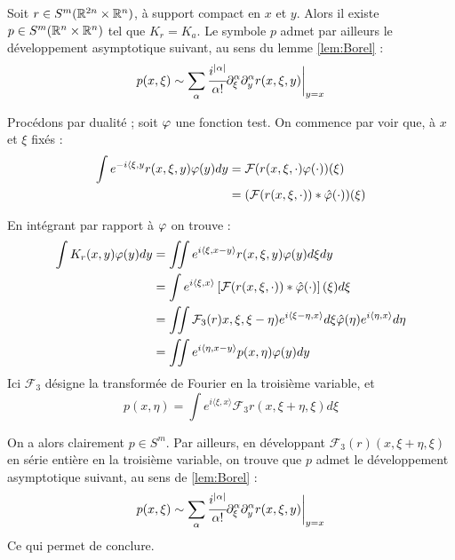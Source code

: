 \begin{lem}
	Soit $r \in S^m(\mathbb{R}^{2n}\times \mathbb{R}^n)$, à support compact en $x$ et $y$. Alors il existe $p \in S^m(\mathbb{R}^n \times \mathbb{R}^n)$ tel que $K_r = K_a$. Le symbole $p$ admet par ailleurs le développement asymptotique suivant, au sens du lemme \ref{lem:Borel} :
	\begin{equation*}
	p(x,\xi) \sim \sum_{\alpha}\cfrac{i^{|\alpha|}}{\alpha!}\partial^{\alpha}_{\xi}\partial^{\alpha}_yr(x,\xi,y)\biggl|_{y=x}
	\end{equation*}
\end{lem}
\begin{preuve}
	Procédons par dualité ; soit $\varphi$ une fonction test. On commence par voir que, à $x$ et $\xi$ fixés :
	\begin{align*}
		\int e^{-i\langle \xi, y}r(x,\xi,y)\varphi(y)dy &= \mathcal{F}(r(x,\xi,\cdot) \varphi(\cdot))(\xi)\\
			&= (\mathcal{F}(r(x,\xi,\cdot)) * \hat{\varphi}(\cdot))(\xi)
	\end{align*}
	
	En intégrant par rapport à $\varphi$ on trouve :
	\begin{align*}
		\int K_r(x,y)\varphi(y)dy &= \iint e^{i\langle \xi,x-y\rangle}r(x,\xi,y)\varphi(y)d\xi dy\\
		&=\int e^{i\langle \xi,x \rangle} \left[\mathcal{F}(r(x,\xi,\cdot))*\hat{\varphi}(\cdot)\right](\xi)d\xi\\
		&= \iint \mathcal{F}_3(r)x,\xi,\xi-\eta)e^{i\langle \xi-\eta,x\rangle}d\xi \hat{\varphi}(\eta)e^{i\langle \eta,x\rangle} d\eta\\
		&=\iint e^{i\langle \eta,x-y \rangle}  p(x,\eta) \varphi(y)dy
	\end{align*}
	Ici $\mathcal{F}_3$ désigne la transformée de Fourier en la troisième variable, et 
	\begin{equation*}
		p(x,\eta) = \int e^{i\langle \xi,x\rangle}\mathcal{F}_3{r}(x,\xi+\eta, \xi)d\xi
	\end{equation*}
	
	On a alors clairement $p \in S^m$. Par ailleurs, en développant $\mathcal{F}_3(r)(x,\xi+\eta, \xi)$ en série entière en la troisième variable, on trouve que $p$ admet le développement asymptotique suivant, au sens de \ref{lem:Borel} :
	\begin{equation*}
		p(x,\xi) \sim \sum_{\alpha}\cfrac{i^{|\alpha|}}{\alpha!}\partial^{\alpha}_{\xi}\partial^{\alpha}_yr(x,\xi,y)\biggl|_{y=x}
	\end{equation*}
	Ce qui permet de conclure.
\end{preuve}

